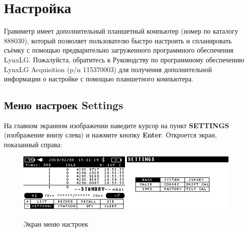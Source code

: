 \chapter[Настройка]{Настройка \cg{}}
\label{chap:setting_up_your_cg6_autograv}

Гравиметр \cg{} имеет дополнительный планшетный компьютер (номер по каталогу
888030), который позволяет пользователю быстро настроить и спланировать съёмку с
помощью предварительно загруженного программного обеспечения LynxLG.
Пожалуйста, обратитесь к Руководству по программному обеспечению LynxLG
Acquisition (p/n 115370003) для получения дополнительной информации о настройке
с помощью планшетного компьютера.


\section{Меню настроек Settings}

На главном экранном изображении наведите курсор на пункт \textbf{SETTINGS}
(изображение внизу слева) и нажмите кнопку \textbf{Enter}. Откроется экран,
показанный справа:

\newpage
\begin{figure}[H]
  \centering
  \includegraphics[width=0.49\textwidth]{figures/the_settings_screen_1}
  \includegraphics[width=0.49\textwidth]{figures/the_settings_screen_2}
  \caption{Экран меню настроек}
  \label{fig:the_settings_screen}
\end{figure}

